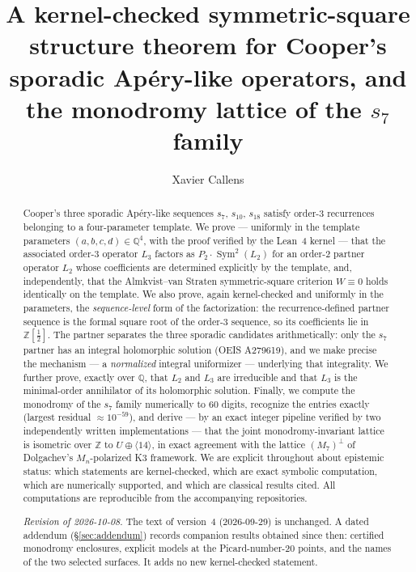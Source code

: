 \documentclass[11pt]{amsart}
\theoremstyle{plain}
\theoremstyle{definition}
\theoremstyle{definition}
\newcommand{\Q}{\mathbb{Q}}
\newcommand{\Z}{\mathbb{Z}}
\newcommand{\U}{U}                       %
\newcommand{\Ltwo}{L_2}
\newcommand{\Lthree}{L_3}
\newcommand{\Symtwo}{\operatorname{Sym}^2}
\newcommand{\lat}[1]{\langle #1\rangle}
\begin{document}
\title[Symmetric squares of Cooper's sporadic operators]{A kernel-checked
symmetric-square structure theorem for Cooper's sporadic Ap\'ery-like
operators, and the monodromy lattice of the $s_7$ family}

\author{Xavier Callens}

\begin{abstract}
Cooper's three sporadic Ap\'ery-like sequences $s_7$, $s_{10}$, $s_{18}$
satisfy order-3 recurrences belonging to a four-parameter template. We prove
--- uniformly in the template parameters $(a,b,c,d)\in\Q^4$, with the proof
verified by the Lean~4 kernel --- that the associated order-3 operator
$\Lthree$ factors as $P_2\cdot\Symtwo(\Ltwo)$ for an order-2 partner operator
$\Ltwo$ whose coefficients are determined explicitly by the template, and,
independently, that the Almkvist--van Straten symmetric-square criterion
$W\equiv 0$ holds identically on the template. We also prove, again
kernel-checked and uniformly in the parameters, the \emph{sequence-level} form
of the factorization: the recurrence-defined partner sequence is the formal
square root of the order-3 sequence, so its coefficients lie in
$\Z[\tfrac12]$. The partner separates the three
sporadic candidates arithmetically: only the $s_7$ partner has an integral
holomorphic solution (OEIS A279619), and we make precise the mechanism --- a
\emph{normalized} integral uniformizer --- underlying that integrality. We
further prove, exactly over $\Q$, that $\Ltwo$ and $\Lthree$ are irreducible
and that $\Lthree$ is the minimal-order annihilator of its holomorphic
solution. Finally, we compute the monodromy of the $s_7$ family numerically to
60 digits, recognize the entries exactly (largest residual
$\approx 10^{-59}$), and derive --- by an exact integer pipeline verified by
two independently written implementations --- that the joint
monodromy-invariant lattice is isometric over $\Z$ to $\U\oplus\lat{14}$, in
exact agreement with the lattice $(M_7)^{\perp}$ of Dolgachev's $M_n$-polarized
K3 framework. We are explicit throughout about epistemic status: which
statements are kernel-checked, which are exact symbolic computation, which are
numerically supported, and which are classical results cited. All
computations are reproducible from the accompanying repositories.

\smallskip\noindent\emph{Revision of 2026-10-08.} The text of version~4 (2026-09-29) is unchanged. A dated
addendum (\S\ref{sec:addendum}) records companion results obtained since then: certified monodromy enclosures,
explicit models at the Picard-number-20 points, and the names of the two selected surfaces. It adds no new
kernel-checked statement.
\end{abstract}
\end{document}
